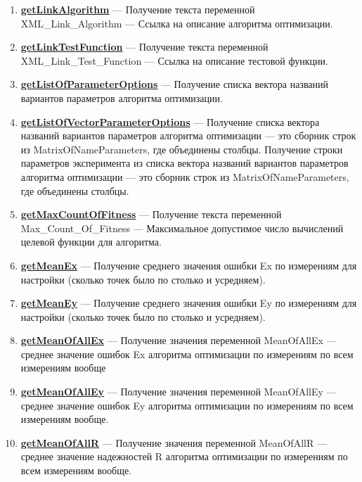 \documentclass[a4paper,12pt]{article}
\begin{document}
\begin{enumerate}
	\item \textbf{\hyperref[getLinkAlgorithm]{getLinkAlgorithm}} --- Получение текста переменной  XML\_Link\_Algorithm --- Ссылка на описание алгоритма оптимизации.
	
	\item \textbf{\hyperref[getLinkTestFunction]{getLinkTestFunction}} --- Получение текста переменной  XML\_Link\_Test\_Function --- Ссылка на описание тестовой функции.
	
	\item \textbf{\hyperref[getListOfParameterOptions]{getListOfParameterOptions}} --- Получение списка вектора названий вариантов параметров алгоритма оптимизации.
	
	\item \textbf{\hyperref[getListOfVectorParameterOptions]{getListOfVectorParameterOptions}} --- Получение списка вектора названий вариантов параметров алгоритма оптимизации --- это сборник строк из MatrixOfNameParameters, где объединены столбцы. Получение строки параметров эксперимента из списка вектора названий вариантов параметров алгоритма оптимизации --- это сборник строк из MatrixOfNameParameters, где объединены столбцы.
	
	\item \textbf{\hyperref[getMaxCountOfFitness]{getMaxCountOfFitness}} --- Получение текста переменной  Max\_Count\_Of\_Fitness --- Максимальное допустимое число вычислений целевой функции для алгоритма.
	
	\item \textbf{\hyperref[getMeanEx]{getMeanEx}} --- Получение среднего значения ошибки Ex по измерениям для настройки (сколько точек было по столько и усредняем).
	
	\item \textbf{\hyperref[getMeanEy]{getMeanEy}} --- Получение среднего значения ошибки Ey по измерениям для настройки (сколько точек было по столько и усредняем).
	
	\item \textbf{\hyperref[getMeanOfAllEx]{getMeanOfAllEx}} --- Получение значения переменной MeanOfAllEx --- среднее значение ошибок Ex алгоритма оптимизации по измерениям по всем измерениям вообще
	
	\item \textbf{\hyperref[getMeanOfAllEy]{getMeanOfAllEy}} --- Получение значения переменной MeanOfAllEy --- среднее значение ошибок Ey алгоритма оптимизации по измерениям по всем измерениям вообще.
	
	\item \textbf{\hyperref[getMeanOfAllR]{getMeanOfAllR}} --- Получение значения переменной MeanOfAllR --- среднее значение надежностей R алгоритма оптимизации по измерениям по всем измерениям вообще.
	

\end{enumerate}
\end{document}
